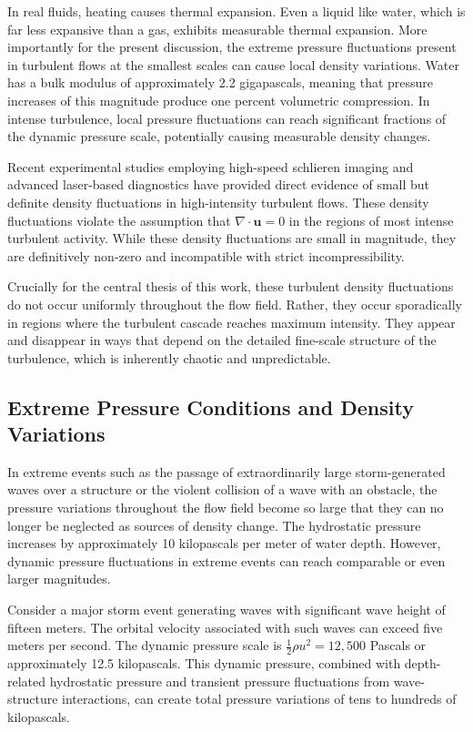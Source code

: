 ﻿\documentclass[a4paper,11pt]{article}
\theoremstyle{definition}
\begin{document}
In real fluids, heating causes thermal expansion. Even a liquid like water, which is far less expansive than a gas, exhibits measurable thermal expansion. More importantly for the present discussion, the extreme pressure fluctuations present in turbulent flows at the smallest scales can cause local density variations. Water has a bulk modulus of approximately 2.2 gigapascals, meaning that pressure increases of this magnitude produce one percent volumetric compression. In intense turbulence, local pressure fluctuations can reach significant fractions of the dynamic pressure scale, potentially causing measurable density changes.

Recent experimental studies employing high-speed schlieren imaging and advanced laser-based diagnostics have provided direct evidence of small but definite density fluctuations in high-intensity turbulent flows. These density fluctuations violate the assumption that $\nabla \cdot \mathbf{u} = 0$ in the regions of most intense turbulent activity. While these density fluctuations are small in magnitude, they are definitively non-zero and incompatible with strict incompressibility.

Crucially for the central thesis of this work, these turbulent density fluctuations do not occur uniformly throughout the flow field. Rather, they occur sporadically in regions where the turbulent cascade reaches maximum intensity. They appear and disappear in ways that depend on the detailed fine-scale structure of the turbulence, which is inherently chaotic and unpredictable.

\subsection{Extreme Pressure Conditions and Density Variations}

In extreme events such as the passage of extraordinarily large storm-generated waves over a structure or the violent collision of a wave with an obstacle, the pressure variations throughout the flow field become so large that they can no longer be neglected as sources of density change. The hydrostatic pressure increases by approximately 10 kilopascals per meter of water depth. However, dynamic pressure fluctuations in extreme events can reach comparable or even larger magnitudes.

Consider a major storm event generating waves with significant wave height of fifteen meters. The orbital velocity associated with such waves can exceed five meters per second. The dynamic pressure scale is $\frac{1}{2}\rho u^2 = 12,500$ Pascals or approximately 12.5 kilopascals. This dynamic pressure, combined with depth-related hydrostatic pressure and transient pressure fluctuations from wave-structure interactions, can create total pressure variations of tens to hundreds of kilopascals.
\end{document}
